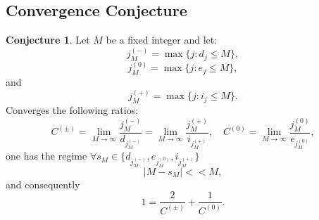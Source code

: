 \documentclass[]{article}
\theoremstyle{plain}%
\theoremstyle{definition}
\newtheorem{conj}{Conjecture}[section]
\theoremstyle{remark}
\begin{document}
\subsection {Convergence Conjecture}
\begin{conj}
	Let $M$ be a fixed integer and let:
	$$ j^{(-)}_M = \max \{ j :  d_j\le M\},$$
	$$ j^{(0)}_M = \max \{ j :  e_j\le M\},$$
	and
	$$ j^{(+)}_M = \max \{ j :  i_j\le M\}.$$
	Converges the following ratios:
	$$ C^{(\pm)} = \lim_{M \to \infty} \frac{j^{(-)}_M}{d_{j^{(-)}_M}} = \lim_{M \to \infty}\frac{j^{(+)}_M}{i_{j^{(+)}_M}}, \quad C^{(0)} = \lim_{M \to \infty} \frac{j^{(0)}_M}{e_{j^{(0)}_M}},$$
	one has the regime $ \forall s_M \in \{d_{j^{(-)}_M},e_{j^{(0)}_M},i_{j^{(+)}_M}\} $
	$$ |M-s_M| << M, $$
	and consequently
	$$ 1 = \frac{2}{ C^{(\pm)}} + \frac{1}{C^{(0)}}.$$
\end{conj}
\end{document}
